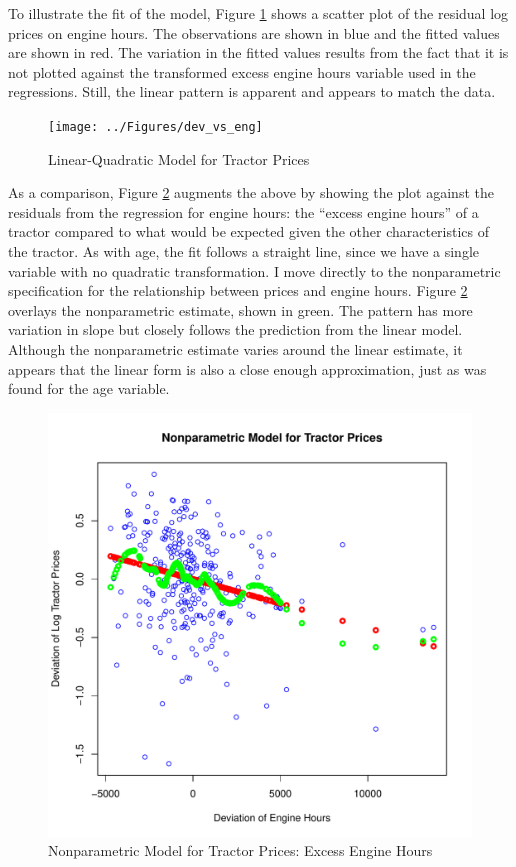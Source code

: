 \documentclass[11pt]{paper}
\begin{document}


\pagebreak 
To illustrate the fit of the model, 
Figure \ref{fig:dev_vs_eng} shows a scatter plot 
of the residual log prices on engine hours. 
The observations are shown in blue
and the fitted values are shown in red.
The variation in the fitted values results from the 
fact that it is not plotted against the transformed excess engine hours variable used in the regressions.
Still, the linear pattern is apparent
and appears to match the data. 

\begin{figure}[h!]
  \centering
  \texttt{[image: ../Figures/dev\_vs\_eng]}
  \caption{Linear-Quadratic Model for Tractor Prices} \label{fig:dev_vs_eng}
\end{figure}



\pagebreak
As a comparison, Figure \ref{fig:dev_np_vs_eng_dev} 
augments the above by showing the plot against the 
residuals from the regression for engine hours:
the ``excess engine hours'' of a tractor compared to what would be 
expected given the other characteristics of the tractor. 
As with age, the fit follows a straight line,
since we have a single variable with no
quadratic transformation.
% 
I move directly to the nonparametric specification for 
the relationship between prices and engine hours.
Figure \ref{fig:dev_np_vs_eng_dev} 
overlays the nonparametric estimate, shown in green. 
The pattern has more variation in slope but 
closely follows the prediction from the linear model. 
Although the nonparametric estimate varies around the linear estimate,
it appears that the linear form
is also a close enough approximation, 
just as was found for the age variable.


\begin{figure}[h!]
  \centering
  \includegraphics[scale = 0.5, keepaspectratio=true]{../Figures/dev_np_vs_eng_dev}
  \caption{Nonparametric Model for Tractor Prices: Excess Engine Hours} \label{fig:dev_np_vs_eng_dev}
\end{figure}
\end{document}
